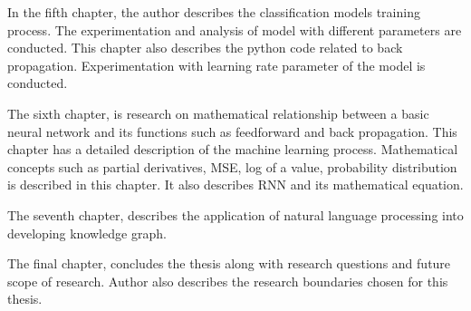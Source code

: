 In the fifth chapter, the author describes the classification models training process. The experimentation and analysis of model with different parameters are conducted. This chapter also describes the python code related to back propagation. Experimentation with learning rate parameter of the model is conducted.

The sixth chapter, is research on mathematical relationship between a basic neural network and its functions such as feedforward and back propagation. This chapter has a detailed description of the machine learning process. Mathematical concepts such as partial derivatives, \acl{MSE}, log of a value, probability distribution is described in this chapter. It also describes \acl{RNN} and its mathematical equation.  

The seventh chapter, describes the application of natural language processing into developing knowledge graph.

The final chapter, concludes the thesis along with research questions and future scope of research. Author also describes the research boundaries chosen for this thesis.  